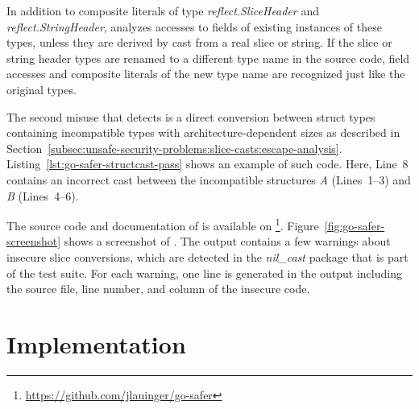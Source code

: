 

In addition to composite literals of type \textit{reflect.SliceHeader} and \textit{reflect.StringHeader}, \toolSafer{}
analyzes accesses to fields of existing instances of these types, unless they are derived by cast from a real slice or
string.
If the slice or string header types are renamed to a different type name in the source code, field accesses and
composite literals of the new type name are recognized just like the original types.

The second misuse that \toolSafer{} detects is a direct conversion between struct types containing incompatible types
with architecture-dependent sizes as described in
Section~\ref{subsec:unsafe-security-problems:slice-casts:escape-analysis}.
Listing~\ref{lst:go-safer-structcast-pass} shows an example of such code.
Here, Line~8 contains an incorrect cast between the incompatible structures \textit{A} (Lines~1--3) and \textit{B}
(Lines~4--6).




The source code and documentation of \toolSafer{} is available on
\github{}\footnote{\url{https://github.com/jlauinger/go-safer}}.
Figure~\ref{fig:go-safer-screenshot} shows a screenshot of \toolSafer{}.
The output contains a few warnings about insecure slice conversions, which are detected in the \textit{nil\_cast}
package that is part of the \toolSafer{} test suite.
For each warning, one line is generated in the output including the source file, line number, and column of the insecure
code.





\section{Implementation}\label{sec:go-safer:implementation}

